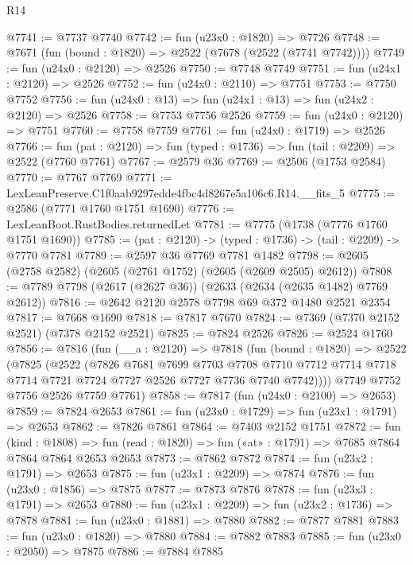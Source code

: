 \begin{lexlean}{R14}
\begin{coremodule}
@7741 := @7737 @7740
@7742 := fun (u23x0 : @1820) => @7726
@7748 := @7671 (fun (bound : @1820) => @2522 (@7678 (@2522 (@7741 @7742))))
@7749 := fun (u24x0 : @2120) => @2526
@7750 := @7748 @7749
@7751 := fun (u24x1 : @2120) => @2526
@7752 := fun (u24x0 : @2110) => @7751
@7753 := @7750 @7752
@7756 := fun (u24x0 : @13) => fun (u24x1 : @13) => fun (u24x2 : @2120) => @2526
@7758 := @7753 @7756 @2526
@7759 := fun (u24x0 : @2120) => @7751
@7760 := @7758 @7759
@7761 := fun (u24x0 : @1719) => @2526
@7766 := fun (pat : @2120) => fun (typed : @1736) => fun (tail : @2209) => @2522 (@7760 @7761)
@7767 := @2579 @36
@7769 := @2506 (@1753 @2584)
@7770 := @7767 @7769
@7771 := LexLeanPreserve.C1f0aab9297edde4fbc4d8267e5a106c6.R14.__fits_5
@7775 := @2586 (@7771 @1760 @1751 @1690)
@7776 := LexLeanBoot.RustBodies.returnedLet
@7781 := @7775 (@1738 (@7776 @1760 @1751 @1690))
@7785 := (pat : @2120) -> (typed : @1736) -> (tail : @2209) -> @7770 @7781
@7789 := @2597 @36 @7769 @7781 @1482
@7798 := @2605 (@2758 @2582) (@2605 (@2761 @1752) (@2605 (@2609 @2505) @2612))
@7808 := @7789 @7798 (@2617 (@2627 @36)) (@2633 (@2634 (@2635 @1482) @7769 @2612))
@7816 := @2642 @2120 @2578 @7798 @69 @372 @1480 @2521 @2354
@7817 := @7668 @1690
@7818 := @7817 @7670
@7824 := @7369 (@7370 @2152 @2521) (@7378 @2152 @2521)
@7825 := @7824 @2526
@7826 := @2524 @1760
@7856 := @7816
    (fun (__a : @2120) =>
    @7818
      (fun (bound : @1820) =>
      @2522
        (@7825
          (@2522
            (@7826
              @7681
              @7699
              @7703
              @7708
              @7710
              @7712
              @7714
              @7718
              @7714
              @7721
              @7724
              @7727
              @2526
              @7727
              @7736
              @7740
              @7742))))
      @7749
      @7752
      @7756
      @2526
      @7759
      @7761)
@7858 := @7817 (fun (u24x0 : @2100) => @2653)
@7859 := @7824 @2653
@7861 := fun (u23x0 : @1729) => fun (u23x1 : @1791) => @2653
@7862 := @7826 @7861
@7864 := @7403 @2152 @1751
@7872 := fun (kind : @1808) =>
  fun (read : @1820) => fun («at» : @1791) => @7685 @7864 @7864 @7864 @2653 @2653
@7873 := @7862 @7872
@7874 := fun (u23x2 : @1791) => @2653
@7875 := fun (u23x1 : @2209) => @7874
@7876 := fun (u23x0 : @1856) => @7875
@7877 := @7873 @7876
@7878 := fun (u23x3 : @1791) => @2653
@7880 := fun (u23x1 : @2209) => fun (u23x2 : @1736) => @7878
@7881 := fun (u23x0 : @1881) => @7880
@7882 := @7877 @7881
@7883 := fun (u23x0 : @1820) => @7880
@7884 := @7882 @7883
@7885 := fun (u23x0 : @2050) => @7875
@7886 := @7884 @7885

\end{coremodule}
\end{lexlean}
